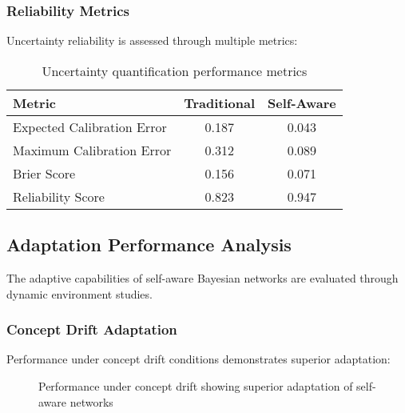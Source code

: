 \documentclass[12pt,a4paper]{article}
\begin{document}
\subsubsection{Reliability Metrics}

Uncertainty reliability is assessed through multiple metrics:

\begin{table}[H]
\centering
\begin{tabular}{lcc}
\toprule
Metric & Traditional & Self-Aware \\
\midrule
Expected Calibration Error & 0.187 & 0.043 \\
Maximum Calibration Error & 0.312 & 0.089 \\
Brier Score & 0.156 & 0.071 \\
Reliability Score & 0.823 & 0.947 \\
\bottomrule
\end{tabular}
\caption{Uncertainty quantification performance metrics}
\end{table}

\subsection{Adaptation Performance Analysis}

The adaptive capabilities of self-aware Bayesian networks are evaluated through dynamic environment studies.

\subsubsection{Concept Drift Adaptation}

Performance under concept drift conditions demonstrates superior adaptation:

\begin{figure}[H]
\centering
{}
\caption{Performance under concept drift showing superior adaptation of self-aware networks}
\end{figure}
\end{document}
